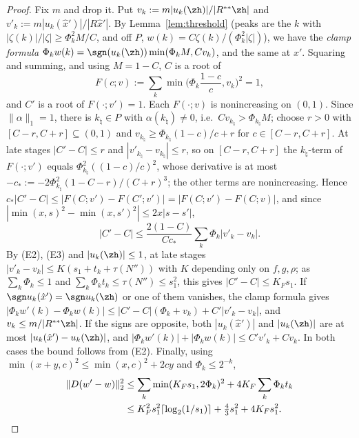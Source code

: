 \begin{proof}
Fix $m$ and drop it.  Put $v_k:=m|u_k(\zh)|/|R^{**}\zh|$ and
$v'_k:=m|u_k(\hat x')|/|R\hat x'|$.  By Lemma~\ref{lem:threshold} (peaks
are the $k$ with $|\zeta(k)|/|\zeta|\ge\Phi_k^2M/C$, and off $P$,
$w(k)=C\zeta(k)/(\Phi_k^2|\zeta|)$), we have the \emph{clamp formula}
$\Phi_kw(k)=\sgn(u_k(\zh))\min(\Phi_kM,Cv_k)$, and the same at $x'$.
Squaring and summing, and using $M=1-C$, $C$ is a root of
\[
 F(c;v):=\sum_k\min\Big(\Phi_k\frac{1-c}c,v_k\Big)^2=1,
\]
and $C'$ is a root of $F(\cdot;v')=1$.  Each $F(\cdot;v)$ is nonincreasing on
$(0,1)$.  Since $\|\alpha\|_1=1$, there is $k_\natural\in P$ with
$\alpha(k_\natural)\ne0$, i.e.\ $Cv_{k_\natural}>\Phi_{k_\natural}M$; choose
$r>0$ with $[C-r,C+r]\subseteq(0,1)$ and $v_{k_\natural}\ge
\Phi_{k_\natural}(1-c)/c+r$ for $c\in[C-r,C+r]$.  At late stages
$|C'-C|\le r$ and $|v'_{k_\natural}-v_{k_\natural}|\le r$, so on
$[C-r,C+r]$ the $k_\natural$-term of $F(\cdot;v')$ equals
$\Phi_{k_\natural}^2((1-c)/c)^2$, whose derivative is at most
$-c_*:=-2\Phi_{k_\natural}^2(1-C-r)/(C+r)^3$; the other terms are
nonincreasing.  Hence $c_*|C'-C|\le|F(C;v')-F(C';v')|=|F(C;v')-F(C;v)|$, and
since $|\min(x,s)^2-\min(x,s')^2|\le2x|s-s'|$,
\[
 |C'-C|\le\frac{2(1-C)}{Cc_*}\sum_k\Phi_k|v'_k-v_k| .
\]
By (E2), (E3) and $|u_k(\zh)|\le1$, at late stages $|v'_k-v_k|\le
K(s_1+t_k+\tau(N''))$ with $K$ depending only on $f,g,\rho$; as
$\sum_k\Phi_k\le1$ and $\sum_k\Phi_kt_k\le\tau(N'')\le s_1^2$, this gives
$|C'-C|\le K_Fs_1$.  If $\sgn u_k(\hat x')=\sgn u_k(\zh)$ or one of them
vanishes, the clamp formula gives $|\Phi_kw'(k)-\Phi_kw(k)|\le
|C'-C|(\Phi_k+v_k)+C'|v'_k-v_k|$, and $v_k\le m/|R^{**}\zh|$.  If the signs
are opposite, both $|u_k(\hat x')|$ and $|u_k(\zh)|$ are at most
$|u_k(\hat x')-u_k(\zh)|$, and $|\Phi_kw'(k)|+|\Phi_kw(k)|\le C'v'_k+Cv_k$.
In both cases the bound follows from (E2).  Finally, using
$\min(x+y,c)^2\le\min(x,c)^2+2cy$ and $\Phi_k\le2^{-k}$,
\begin{align*}
 \|D(w'-w)\|_2^2&\le\sum_k\min(K_Fs_1,2\Phi_k)^2+4K_F\sum_k\Phi_kt_k\\
 &\le K_F^2s_1^2\lceil\log_2(1/s_1)\rceil+\tfrac43s_1^2+4K_Fs_1^2 .
 \qedhere
\end{align*}
\end{proof}


